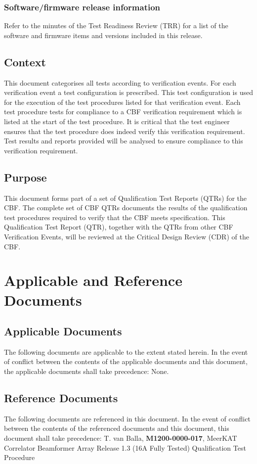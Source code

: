 \subsection{Software/firmware release information}
Refer to the minutes of the Test Readiness Review (TRR) for a list of the software and firmware items and versions included in this release.
\section{Context}
This document categorises all tests according to verification events. For each verification event a test configuration is prescribed. This test configuration is used for the execution of the test procedures listed for that verification event. Each test procedure tests for compliance to a CBF verification requirement which is listed at the start of the test procedure. It is critical that the test engineer ensures that the test procedure does indeed verify this verification requirement. Test results and reports provided will be analysed to ensure compliance to this verification requirement.
\section{Purpose}
This document forms part of a set of Qualification Test Reports (QTRs) for the CBF. The complete set of CBF QTRs documents the results of the qualification test procedures required to verify that the CBF meets specification.
This Qualification Test Report (QTR), together with the QTRs from other CBF Verification Events, will be reviewed at the Critical Design Review (CDR) of the CBF.
\chapter{Applicable and Reference Documents}
\section{Applicable Documents}
The following documents are applicable to the extent stated herein. In the event of conflict between the contents of the applicable documents and this document, the applicable documents shall take precedence:\newline\newline
\hspace{10mm} None.
\section{Reference Documents}
The following documents are referenced in this document. In the event of conflict between the contents of the referenced documents and this document, this document shall take precedence:\newline
[1]\hspace{10mm} T. van Balla, {\bf M1200-0000-017}, MeerKAT Correlator Beamformer Array Release 1.3 (16A Fully Tested) Qualification Test Procedure
